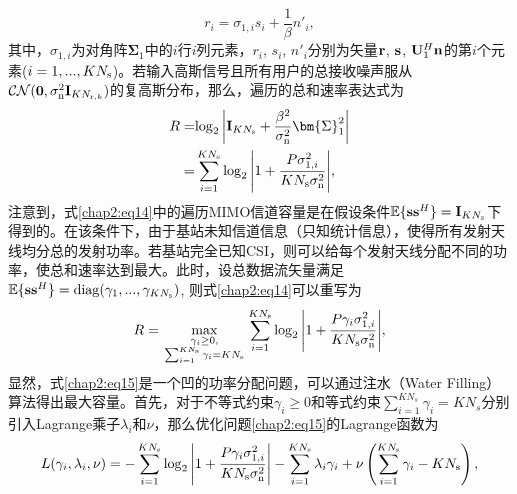 \begin{equation}\label{chap2:eq13}
  {r_i} = {\sigma _{1,i}}{s_i} + \frac{1}{\beta }{n'_i},
\end{equation}
其中，${{\sigma _{1,i}}}$为对角阵${{{\bm{\Sigma }}_1}}$中的${i}$行${i}$列元素，${{r_i}}$, ${s_i}$, ${n'_i}$分别为矢量${{\bf{r}}}$, ${{\bf{s}}}$, ${{\bf{U}}_1^H{\bf{n}}}$的第${i}$个元素(${i = 1,...,K{N_{\rm{s}}}}$)。若输入高斯信号且所有用户的总接收噪声服从${\mathcal{CN}({\bf{0}},\sigma _{\rm{n}}^2{{\bf{I}}_{K{{N_{{\rm{r}},k}}}}})}$的复高斯分布，那么，遍历的总和速率表达式为
\begin{align}\label{chap2:eq14}
  \nonumber R = & {\log _2}\left| {{{\bf{I}}_{K{N_{\rm{s}}}}} + \frac{{{\beta ^2}}}{{\sigma _{\rm{n}}^2}}{\bm{\Sigma }}_1^2} \right| \\
  = & \sum\limits_{i = 1}^{K{N_{\rm{s}}}} {{{\log }_2}\left| {1 + \frac{{P\sigma _{1,i}^2}}{{K{N_{\rm{s}}}\sigma _{\rm{n}}^2}}} \right|},
\end{align}
注意到，式\eqref{chap2:eq14}中的遍历MIMO信道容量是在假设条件${\mathbb{E}\{ {\bf{s}}{{\bf{s}}^H}\}  = {{\bf{I}}_{K{N_{\rm{s}}}}}}$下得到的。在该条件下，由于基站未知信道信息（只知统计信息），使得所有发射天线均分总的发射功率。若基站完全已知CSI，则可以给每个发射天线分配不同的功率，使总和速率达到最大。此时，设总数据流矢量满足${\mathbb{E}\{ {\bf{s}}{{\bf{s}}^H}\}  = {\rm{diag}}({\gamma _1},...,{\gamma _{K{N_{\rm{s}}}}})}$, 则式\eqref{chap2:eq14}可以重写为
\begin{equation}\label{chap2:eq15}
  R = \mathop {\max }\limits_{\scriptstyle{\gamma _i} \ge 0,\atop
\scriptstyle\sum\nolimits_{i = 1}^{K{N_{\rm{s}}}} {{\gamma _i}}  = K{N_{\rm{s}}}} \sum\limits_{i = 1}^{K{N_{\rm{s}}}} {{{\log }_2}\left| {1 + \frac{{P{\gamma _i}\sigma _{1,i}^2}}{{K{N_{\rm{s}}}\sigma _{\rm{n}}^2}}} \right|} ,
\end{equation}
显然，式\eqref{chap2:eq15}是一个凹的功率分配问题，可以通过注水（Water Filling）算法得出最大容量。首先，对于不等式约束${{\gamma _i} \ge 0}$和等式约束${\sum\nolimits_{i = 1}^{K{N_s}} {{\gamma _i}}  = K{N_s}}$分别引入Lagrange乘子${{\lambda _i}}$和${\nu}$，那么优化问题\eqref{chap2:eq15}的Lagrange函数为
\begin{equation}\label{chap2:eq16}
  L({\gamma _i},{\lambda _i},\nu ) =  - \sum\limits_{i = 1}^{K{N_{\rm{s}}}} {{{\log }_2}\left| {1 + \frac{{P{\gamma _i}\sigma _{1,i}^2}}{{K{N_{\rm{s}}}\sigma _{\rm{n}}^2}}} \right|}  - \sum\limits_{i = 1}^{K{N_{\rm{s}}}} {{\lambda _i}{\gamma _i}}  + \nu \left( {\sum\limits_{i = 1}^{K{N_{\rm{s}}}} {{\gamma _i}}  - K{N_{\rm{s}}}} \right),
\end{equation}
